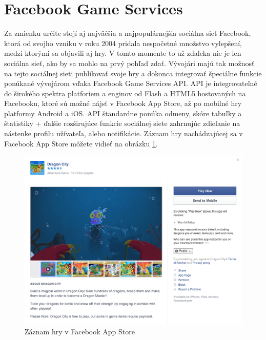 \section{Facebook Game Services}
Za zmienku určite stojí aj najväčšia a najpopulárnejšia sociálna sieť Facebook, ktorá od svojho vzniku v roku 2004 pridala nespočetné množstvo vylepšení, medzi ktorými sa objavili aj hry. V tomto momente to už zďaleka nie je len sociálna sieť, ako by sa mohlo na prvý pohľad zdať. Vývojári majú tak možnosť na tejto sociálnej sieti publikovať svoje hry a dokonca integrovať špeciálne funkcie ponúkané vývojárom vďaka Facebook Game Services API. API je integrovateľné do širokého spektra platforiem a enginov od Flash a HTML5 hostovaných na Facebooku, ktoré sú možné nájsť v Facebook App Store, až po mobilné hry platformy Android a iOS. API štandardne ponúka odmeny, skóre tabuľky a štatistiky + ďalšie rozširujúce funkcie sociálnej siete zahrnujúc zdieľanie na nástenke profilu užívateľa, alebo notifikácie. Záznam hry nachádzajúcej sa v Facebook App Store môžete vidieť na obrázku \ref{fig:facebook}. \cite{facebook-developers}
\begin{figure}[h]
  \centering
  \includegraphics[scale=0.17]{fig/facebook.png}
  \caption{Záznam hry v Facebook App Store}
  \label{fig:facebook}
\end{figure}


